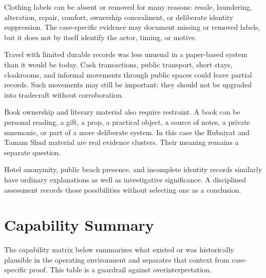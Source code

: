 Clothing labels can be absent or removed for many reasons: resale, laundering, alteration, repair, comfort, ownership concealment, or deliberate identity suppression. The case-specific evidence may document missing or removed labels, but it does not by itself identify the actor, timing, or motive.

Travel with limited durable records was less unusual in a paper-based system than it would be today. Cash transactions, public transport, short stays, cloakrooms, and informal movements through public spaces could leave partial records. Such movements may still be important; they should not be upgraded into tradecraft without corroboration.

Book ownership and literary material also require restraint. A book can be personal reading, a gift, a prop, a practical object, a source of notes, a private mnemonic, or part of a more deliberate system. In this case the Rubaiyat and Tamam Shud material are real evidence clusters. Their meaning remains a separate question.

Hotel anonymity, public beach presence, and incomplete identity records similarly have ordinary explanations as well as investigative significance. A disciplined assessment records those possibilities without selecting one as a conclusion.

\section{Capability Summary}

The capability matrix below summarizes what existed or was historically plausible in the operating environment and separates that context from case-specific proof. This table is a guardrail against overinterpretation.

